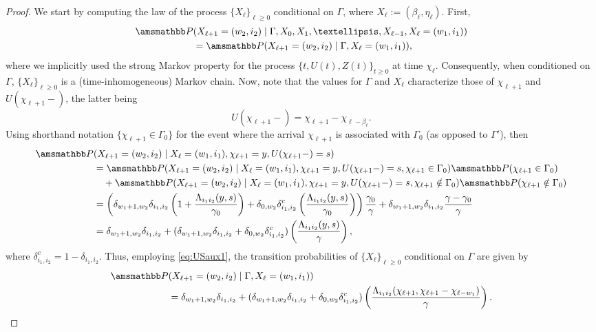 \documentclass[11pt,leqno]{amsart}
\numberwithin{table}{section}
\numberwithin{figure}{section}
\numberwithin{equation}{section}
\newcommand{\1}{{\mathds{1}}}
\newcommand{\0}{\mat{0}}
\renewcommand{\P }{{\amsmathbb P}}
\begin{document}
\begin{proof}
We start by computing the law of the process $\{X_{\ell}\}_{\ell\ge 0}$ conditional on $\Gamma$, where $X_{\ell}:=(\beta_\ell, \eta_\ell)$. First, 
\begin{align*}
\P&(X_{\ell+1}=(w_2,i_2)\mid \Gamma, X_0, X_1,\dots, X_{\ell-1}, X_{\ell}=(w_1,i_1))\\
& = \P(X_{\ell+1}=(w_2,i_2)\mid \Gamma, X_{\ell}=(w_1,i_1)),
\end{align*}
where we implicitly used the strong Markov property for the process $\{t,U(t),Z(t)\}_{t\ge 0}$ at time $\chi_\ell$. Consequently, when conditioned on $\Gamma$, $\{X_{\ell}\}_{\ell\ge 0}$ is a (time-inhomogeneous) Markov chain. Now, note that the values for $\Gamma$ and $X_{\ell}$ characterize those of $\chi_{\ell+1}$ and $U(\chi_{\ell+1}-)$, the latter being
\begin{equation}\label{eq:USaux1}
U(\chi_{\ell+1}-)=\chi_{\ell+1} - \chi_{\ell-\beta_\ell}.
\end{equation} 
Using shorthand notation $\{\chi_{\ell+1}\in\Gamma_0\}$ for the event where the arrival $\chi_{\ell+1}$ is associated with $\Gamma_0$ (as opposed to $\Gamma'$), then
\begin{align*}
\P&(X_{\ell+1}=(w_2,i_2)\mid X_{\ell}=(w_1,i_1), \chi_{\ell+1}=y, U(\chi_{\ell+1}-)= s)\\
&  = \P(X_{\ell+1}=(w_2,i_2)\mid X_{\ell}=(w_1,i_1), \chi_{\ell+1}=y, U(\chi_{\ell+1}-)= s, \chi_{\ell+1}\in\Gamma_0)\P(\chi_{\ell+1}\in\Gamma_0)\\
& \quad + \P(X_{\ell+1}=(w_2,i_2)\mid X_{\ell}=(w_1,i_1), \chi_{\ell+1}=y, U(\chi_{\ell+1}-)= s, \chi_{\ell+1}\notin\Gamma_0)\P(\chi_{\ell+1}\notin\Gamma_0)\\
&= \left(\delta_{w_1+1,w_2} \delta_{i_1,i_2} \left(1+ \frac{\Lambda_{i_1 i_2}(y,s)}{\gamma_0}\right) + \delta_{0,w_2}\delta_{i_1,i_2}^c \left(\frac{\Lambda_{i_1 i_2}(y,s)}{\gamma_0}\right)\right)\frac{\gamma_0}{\gamma} + \delta_{w_1+1,w_2}\delta_{i_1,i_2}\frac{\gamma-\gamma_0}{\gamma}\\
&= \delta_{w_1+1,w_2}\delta_{i_1,i_2} + (\delta_{w_1+1,w_2}\delta_{i_1,i_2} + \delta_{0,w_2}\delta_{i_1,i_2}^c)\left(\frac{\Lambda_{i_1 i_2}(y,s)}{\gamma}\right),
\end{align*}
where $\delta_{i_1,i_2}^c = 1 - \delta_{i_1,i_2}$. Thus, employing \eqref{eq:USaux1}, the transition probabilities of $\{X_\ell\}_{\ell\ge 0}$ conditional on $\Gamma$ are given by
\begin{align*}
\P&(X_{\ell+1}=(w_2,i_2)\mid \Gamma, X_{\ell}=(w_1,i_1))\\
&=\delta_{w_1+1,w_2}\delta_{i_1,i_2} + (\delta_{w_1+1,w_2}\delta_{i_1,i_2} + \delta_{0,w_2}\delta_{i_1,i_2}^c)\left(\frac{\Lambda_{i_1 i_2}(\chi_{\ell+1},\chi_{\ell+1}-\chi_{\ell-w_1})}{\gamma}\right).
\end{align*}


\end{proof}
\end{document}
